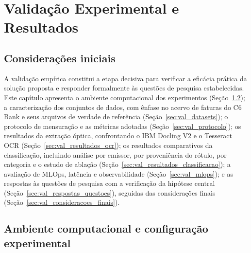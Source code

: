 \chapter{Validação Experimental e Resultados} \label{Cap:Ava_Exp}

\label{chp:validacao}

\section{Considerações iniciais}
\label{sec:val_consideracoes_iniciais}

A validação empírica constitui a etapa decisiva para verificar a eficácia prática da solução proposta e responder formalmente às questões de pesquisa estabelecidas. Este capítulo apresenta o ambiente computacional dos experimentos (Seção~\ref{sec:val_ambiente}); a caracterização dos conjuntos de dados, com ênfase no acervo de faturas do C6 Bank e seus arquivos de verdade de referência (Seção~\ref{sec:val_datasets}); o protocolo de mensuração e as métricas adotadas (Seção~\ref{sec:val_protocolo}); os resultados da extração óptica, confrontando o IBM Docling V2 e o Tesseract OCR (Seção~\ref{sec:val_resultados_ocr}); os resultados comparativos da classificação, incluindo análise por emissor, por proveniência do rótulo, por categoria e o estudo de ablação (Seção~\ref{sec:val_resultados_classificacao}); a avaliação de MLOps, latência e observabilidade (Seção~\ref{sec:val_mlops}); e as respostas às questões de pesquisa com a verificação da hipótese central (Seção~\ref{sec:val_respostas_questoes}), seguidas das considerações finais (Seção~\ref{sec:val_consideracoes_finais}).

\section{Ambiente computacional e configuração experimental}
\label{sec:val_ambiente}

